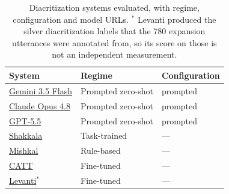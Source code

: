 \begin{table}[t]
\centering
\small
\begin{tabular}{l l l}
\toprule
\textbf{System} & \textbf{Regime} & \textbf{Configuration} \\
\midrule
\href{https://ai.google.dev/gemini-api/docs/models}{Gemini 3.5 Flash} & Prompted zero-shot & prompted \\
\href{https://docs.claude.com/en/docs/about-claude/models}{Claude Opus 4.8} & Prompted zero-shot & prompted \\
\href{https://platform.openai.com/docs/models}{GPT-5.5} & Prompted zero-shot & prompted \\
\href{https://github.com/Barqawiz/Shakkala}{Shakkala} & Task-trained & --- \\
\href{https://github.com/linuxscout/mishkal}{Mishkal} & Rule-based & --- \\
\href{https://github.com/abjadai/catt}{CATT} & Fine-tuned & --- \\
\href{https://huggingface.co/guymorlan/levanti_arabic2diacritics}{Levanti}$^{*}$ & Fine-tuned & --- \\
\bottomrule
\end{tabular}
\caption{Diacritization systems evaluated, with regime, configuration and model URLs. $^{*}$ Levanti produced the silver diacritization labels that the 780 expansion utterances were annotated from, so its score on those is not an independent measurement.}
\label{tab:diac-models}
\end{table}
